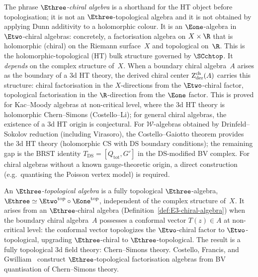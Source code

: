 \begin{definition}
\label{def:E3-chiral-algebra}
The phrase \emph{$\Ethree$-chiral algebra} is a shorthand for the HT
object before topologisation; it is not an $\Ethree$-topological
algebra and it is not obtained by applying Dunn additivity to a
holomorphic colour. It is an
$\Eone$-algebra in $\Etwo$-chiral algebras: concretely, a
factorisation algebra on $X \times \R$ that is holomorphic
(chiral) on the Riemann surface~$X$ and topological on~$\R$. This is the
holomorphic-topological (HT) bulk structure governed by
$\SCchtop$. It \emph{depends} on the complex structure of~$X$.
When a boundary chiral algebra~$A$ arises as the boundary of a
$3$d HT theory, the derived chiral center
$\operatorname{Z}_{\mathrm{der}}^{\mathrm{ch}}(A)$ carries this structure: chiral
factorisation in the $X$-directions from the $\Etwo$-chiral
factor, topological factorisation in the $\R$-direction from the
$\Eone$ factor. This is proved for Kac--Moody algebras at
non-critical level, where the $3$d HT theory is holomorphic
Chern--Simons (Costello--Li); for general chiral algebras, the existence of a $3$d HT
origin is conjectural. For $\mathcal{W}$-algebras obtained
by Drinfeld--Sokolov reduction (including Virasoro), the
Costello--Gaiotto theorem provides the $3$d HT theory
(holomorphic CS with DS boundary conditions); the remaining
gap is the BRST identity $T_{\mathrm{DS}} = [Q_{\mathrm{tot}}, G']$
in the DS-modified BV complex. For chiral algebras
without a known gauge-theoretic origin, a direct construction
(e.g.\ quantising the Poisson vertex model) is required.
\end{definition}

\begin{definition}
\label{def:E3-topological-algebra}
An \emph{$\Ethree$-topological algebra} is a fully topological
$\Ethree$-algebra, $\Ethree \simeq \Etwo^{\mathrm{top}} \circ
\Eone^{\mathrm{top}}$, independent of the complex structure
of~$X$. It arises from an $\Ethree$-chiral algebra
(Definition~\ref{def:E3-chiral-algebra}) when the boundary
chiral algebra~$A$ possesses a conformal vector
$T(z) \in A$ at non-critical level: the conformal vector
topologizes the $\Etwo$-chiral factor to $\Etwo$-topological,
upgrading $\Ethree$-chiral to $\Ethree$-topological. The
result is a fully topological $3$d field theory: Chern--Simons
theory. Costello, Francis, and Gwilliam~\cite{CFG26} construct
$\Ethree$-topological factorisation algebras from BV
quantisation of Chern--Simons theory.
\end{definition}

